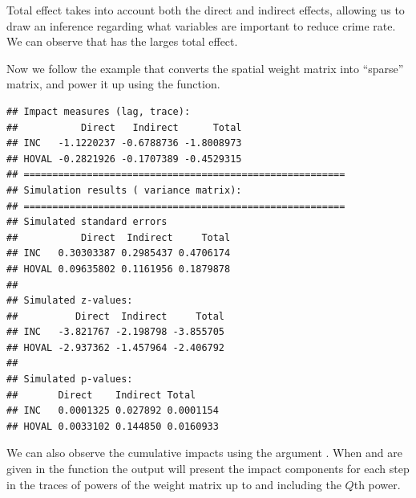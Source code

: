 Total effect takes into account both the direct and indirect effects, allowing us to draw an inference regarding what variables are important to reduce crime rate. We can observe that  has the larges total effect.

Now we follow the example that converts the spatial weight matrix into ``sparse'' matrix, and power it up using the  function.

\begin{knitrout}
\color{fgcolor}\begin{kframe}
\begin{alltt}
 \hlkwb{<-} \hlstd{(}  \hlstd{=} \hlstd{),} \hlstd{)}
 \hlkwb{<-}   \hlstd{=} \hlstd{)}
 \hlkwb{<-}     \hlstd{=} \hlstd{)}
  \hlstd{=}  \hlstd{,}  \hlstd{=} \hlstd{)}
\end{alltt}
\begin{verbatim}
## Impact measures (lag, trace):
##           Direct   Indirect      Total
## INC   -1.1220237 -0.6788736 -1.8008973
## HOVAL -0.2821926 -0.1707389 -0.4529315
## ========================================================
## Simulation results ( variance matrix):
## ========================================================
## Simulated standard errors
##           Direct  Indirect     Total
## INC   0.30303387 0.2985437 0.4706174
## HOVAL 0.09635802 0.1161956 0.1879878
## 
## Simulated z-values:
##          Direct  Indirect     Total
## INC   -3.821767 -2.198798 -3.855705
## HOVAL -2.937362 -1.457964 -2.406792
## 
## Simulated p-values:
##       Direct    Indirect Total    
## INC   0.0001325 0.027892 0.0001154
## HOVAL 0.0033102 0.144850 0.0160933
\end{verbatim}
\end{kframe}
\end{knitrout}


We can also observe the cumulative impacts using the argument . When  and  are given in the  function the output will present the impact components for each step in the traces of powers of the weight matrix up to and including the $Q$th power. 

